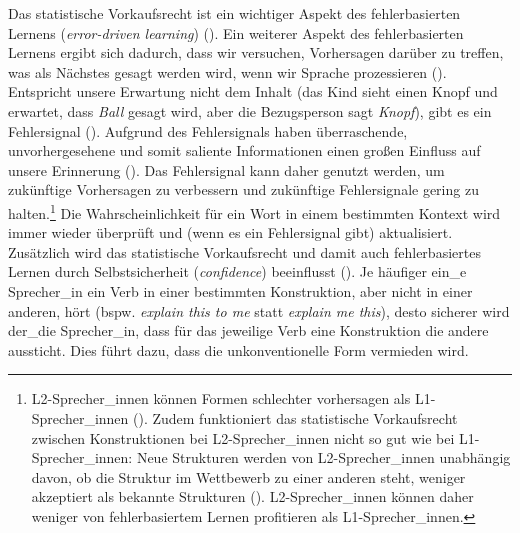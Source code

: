 Das statistische Vorkaufsrecht ist ein wichtiger Aspekt des fehlerbasierten Lernens (\textit{error-driven learning}) (\cite[94]{Goldberg.2019}). Ein weiterer Aspekt des fehlerbasierten Lernens ergibt sich dadurch, dass wir versuchen, Vorhersagen darüber zu treffen, was als Nächstes gesagt werden wird, wenn wir Sprache prozessieren (\cite[91]{Goldberg.2019}). Entspricht unsere Erwartung nicht dem Inhalt (das Kind sieht einen Knopf und erwartet, dass \textit{Ball} gesagt wird, aber die Bezugsperson sagt \textit{Knopf}), gibt es ein Fehlersignal (\cite[91]{Goldberg.2019}). Aufgrund des Fehlersignals haben überraschende, unvorhergesehene und somit saliente Informationen einen großen Einfluss auf unsere Erinnerung (\cite[116]{Goldberg.2019}). Das Fehlersignal kann daher genutzt werden, um zukünftige Vorhersagen zu verbessern und zukünftige Fehlersignale gering zu halten.\footnote{L2-Sprecher\_innen können Formen schlechter vorhersagen als L1-Sprecher\_innen (\cite[115--116]{Goldberg.2019}). Zudem funktioniert das statistische Vorkaufsrecht zwischen Konstruktionen bei L2-Sprecher\_innen nicht so gut wie bei L1-Sprecher\_innen: Neue Strukturen werden von L2-Sprecher\_innen unabhängig davon, ob die Struktur im Wettbewerb zu einer anderen steht, weniger akzeptiert als bekannte Strukturen (\cite[116]{Goldberg.2019}). L2-Sprecher\_innen können daher weniger von fehlerbasiertem Lernen profitieren als L1-Sprecher\_innen.} Die Wahrscheinlichkeit für ein Wort in einem bestimmten Kontext wird immer wieder überprüft und (wenn es ein Fehlersignal gibt) aktualisiert. Zusätzlich wird das statistische Vorkaufsrecht und damit auch fehlerbasiertes Lernen durch Selbstsicherheit (\textit{confidence}) beeinflusst (\cite[88]{Goldberg.2019}). Je häufiger ein\_e Sprecher\_in ein Verb in einer bestimmten Konstruktion, aber nicht in einer anderen, hört (bspw. \textit{explain this to me} statt \textit{explain me this}), desto sicherer wird der\_die Sprecher\_in, dass für das jeweilige Verb eine Konstruktion die andere aussticht. Dies führt dazu, dass die unkonventionelle Form vermieden wird.


